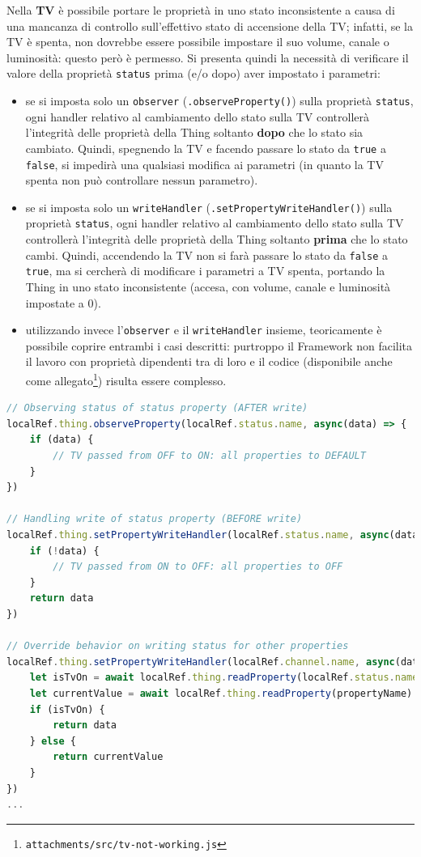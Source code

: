 \documentclass[12pt,a4paper,openright,oneside]{report}
\begin{document}
Nella \textbf{TV} è possibile portare le proprietà in uno stato inconsistente a causa di una mancanza di controllo sull'effettivo stato di accensione della TV; infatti, se la TV è spenta, non dovrebbe essere possibile impostare il suo volume, canale o luminosità: questo però è permesso. Si presenta quindi la necessità di verificare il valore della proprietà \texttt{status} prima (e/o dopo) aver impostato i parametri:

\begin{itemize}
	\item se si imposta solo un \texttt{observer} (\texttt{.observeProperty()}) sulla proprietà \texttt{status}, ogni handler relativo al cambiamento dello stato sulla TV controllerà l'integrità delle proprietà della Thing soltanto \textbf{dopo} che lo stato sia cambiato. Quindi, spegnendo la TV e facendo passare lo stato da \texttt{true} a \texttt{false}, si impedirà una qualsiasi modifica ai parametri (in quanto la TV spenta non può controllare nessun parametro).
	
	\item se si imposta solo un \texttt{writeHandler} (\texttt{.setPropertyWriteHandler()}) sulla proprietà \texttt{status}, ogni handler relativo al cambiamento dello stato sulla TV controllerà l'integrità delle proprietà della Thing soltanto \textbf{prima} che lo stato cambi. Quindi, accendendo la TV non si farà passare lo stato da \texttt{false} a \texttt{true}, ma si cercherà di modificare i parametri a TV spenta, portando la Thing in uno stato inconsistente (accesa, con volume, canale e luminosità impostate a 0).
	
	\item utilizzando invece l'\texttt{observer} e il \texttt{writeHandler} insieme, teoricamente è possibile coprire entrambi i casi descritti: purtroppo il Framework non facilita il lavoro con proprietà dipendenti tra di loro e il codice (disponibile anche come allegato\footnote{\texttt{attachments/src/tv-not-working.js}}) risulta essere complesso.
\end{itemize}

\begin{lstlisting}[language=JavaScript,caption={Solzuione proposta per la dipendenza tra proprietà della Thing},label=lst:solution]
// Observing status of status property (AFTER write)
localRef.thing.observeProperty(localRef.status.name, async(data) => {
	if (data) {
		// TV passed from OFF to ON: all properties to DEFAULT
	}
})

// Handling write of status property (BEFORE write)
localRef.thing.setPropertyWriteHandler(localRef.status.name, async(data) => {
	if (!data) {
		// TV passed from ON to OFF: all properties to OFF
	}
	return data
})

// Override behavior on writing status for other properties
localRef.thing.setPropertyWriteHandler(localRef.channel.name, async(data) => {
	let isTvOn = await localRef.thing.readProperty(localRef.status.name)
	let currentValue = await localRef.thing.readProperty(propertyName)
	if (isTvOn) {
		return data
	} else {
		return currentValue
	}
})
...
\end{lstlisting}
\end{document}
